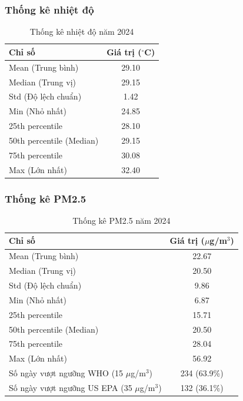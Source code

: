 \documentclass[12pt,a4paper]{article}
\newcommand{\ugm}{$\mu$g/m$^3$}
\newcommand{\degreec}{$^\circ$C}
\begin{document}
\subsubsection{Thống kê nhiệt độ}

\begin{table}[H]
\centering
\caption{Thống kê nhiệt độ năm 2024}
\label{tab:temp-stats}
\begin{tabular}{lc}
\toprule
\textbf{Chỉ số} & \textbf{Giá trị (\degreec{})} \\
\midrule
Mean (Trung bình) & 29.10 \\
Median (Trung vị) & 29.15 \\
Std (Độ lệch chuẩn) & 1.42 \\
Min (Nhỏ nhất) & 24.85 \\
25th percentile & 28.10 \\
50th percentile (Median) & 29.15 \\
75th percentile & 30.08 \\
Max (Lớn nhất) & 32.40 \\
\bottomrule
\end{tabular}
\end{table}

\subsubsection{Thống kê PM2.5}

\begin{table}[H]
\centering
\caption{Thống kê PM2.5 năm 2024}
\label{tab:pm25-stats}
\begin{tabular}{lc}
\toprule
\textbf{Chỉ số} & \textbf{Giá trị (\ugm{})} \\
\midrule
Mean (Trung bình) & 22.67 \\
Median (Trung vị) & 20.50 \\
Std (Độ lệch chuẩn) & 9.86 \\
Min (Nhỏ nhất) & 6.87 \\
25th percentile & 15.71 \\
50th percentile (Median) & 20.50 \\
75th percentile & 28.04 \\
Max (Lớn nhất) & 56.92 \\
\midrule
Số ngày vượt ngưỡng WHO (15 \ugm{}) & 234 (63.9\%) \\
Số ngày vượt ngưỡng US EPA (35 \ugm{}) & 132 (36.1\%) \\
\bottomrule
\end{tabular}
\end{table}
\end{document}

